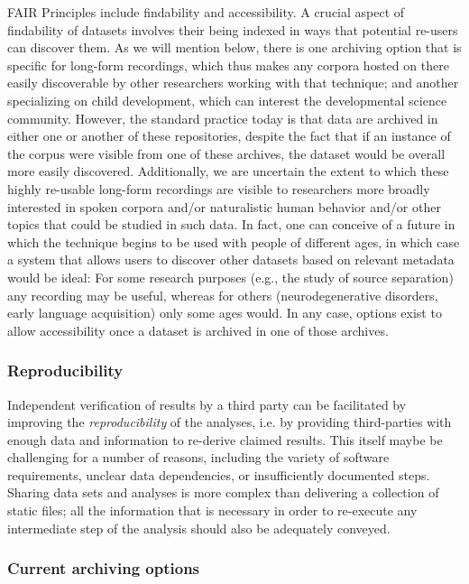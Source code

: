 \documentclass[smallextended]{svjour3}       %
\begin{document}
FAIR Principles include findability and accessibility. A crucial aspect of findability of datasets involves their being indexed in ways that potential re-users can discover them. As we will mention below, there is one archiving option that is specific for long-form recordings, which thus makes any corpora hosted on there easily discoverable by other researchers working with that technique; and another specializing on child development, which can interest the developmental science community. However, the standard practice today is that data are archived in either one or another of these repositories, despite the fact that if an instance of the corpus were visible from one of these archives, the dataset would be overall more easily discovered. Additionally, we are uncertain the extent to which these highly re-usable long-form recordings are visible to researchers more broadly interested in spoken corpora and/or naturalistic human behavior and/or other topics that could be studied in such data. In fact, one can conceive of a future in which the technique begins to be used with people of different ages, in which case a system that allows users to discover other datasets based on relevant metadata would be ideal: For some research purposes (e.g., the study of source separation) any recording may be useful, whereas for others (neurodegenerative disorders, early language acquisition) only some ages would. In any case, options exist to allow accessibility once a dataset is archived in one of those archives.

\subsubsection*{Reproducibility}

Independent verification of results by a third party can be facilitated by improving the \emph{reproducibility} of the analyses, i.e. by providing third-parties with enough data and information to re-derive claimed results. This itself maybe be challenging for a number of reasons, including the variety of software requirements, unclear data dependencies, or insufficiently documented steps. Sharing data sets and analyses is more complex than delivering a collection of static files; all the information that is necessary in order to re-execute any intermediate step of the analysis should also be adequately conveyed.
 


\subsubsection*{Current archiving options}
\end{document}
